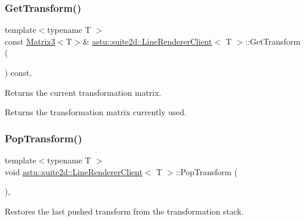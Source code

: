 \subsubsection{\texorpdfstring{Get\+Transform()}{GetTransform()}}
{\footnotesize\ttfamily template$<$typename T $>$ \\
const \hyperlink{classastu_1_1Matrix3}{Matrix3}$<$T$>$\& \hyperlink{classastu_1_1suite2d_1_1LineRendererClient}{astu\+::suite2d\+::\+Line\+Renderer\+Client}$<$ T $>$\+::Get\+Transform (\begin{DoxyParamCaption}{ }\end{DoxyParamCaption}) const\hspace{0.3cm}{\ttfamily [inline]}, {\ttfamily [protected]}}

Returns the current transformation matrix.

\begin{DoxyReturn}{Returns}
the transformation matrix currently used. 
\end{DoxyReturn}
\mbox{\label{classastu_1_1suite2d_1_1LineRendererClient_ade57ff3efe68be03d83203890e4aa64a}} 
\subsubsection{\texorpdfstring{Pop\+Transform()}{PopTransform()}}
{\footnotesize\ttfamily template$<$typename T $>$ \\
void \hyperlink{classastu_1_1suite2d_1_1LineRendererClient}{astu\+::suite2d\+::\+Line\+Renderer\+Client}$<$ T $>$\+::Pop\+Transform (\begin{DoxyParamCaption}{ }\end{DoxyParamCaption})\hspace{0.3cm}{\ttfamily [inline]}, {\ttfamily [protected]}}

Restores the last pushed transform from the transformation stack. \mbox{\label{classastu_1_1suite2d_1_1LineRendererClient_af8761439ae1a93bfe3c11d298e356182}} 
